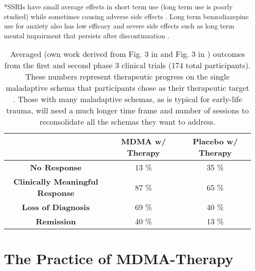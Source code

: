 \documentclass[12pt,letterpaper]{article}
\begin{document}
*SSRIs have small average effects in short term use (long term use is poorly studied) while sometimes causing adverse side effects \cite{ciprianiSSRI,bregginWithdrawal}. Long term benzodiazepine use for anxiety also has low efficacy and severe side effects such as long term mental impairment that persists after discontinuation \cite{shinfukuBenzo,barkerBenzo}. 
\FloatBarrier
\begin{table}[h!]
    \centering
    \caption{Averaged (own work derived from Fig. 3 in \textcite{mitchellMDMAClinicalTrial} and Fig. 3 in \textcite{mitchellMDMAClinicalTrial2}) outcomes from the first and second phase 3 clinical trials (174 total participants). These numbers represent therapeutic progress on the single maladaptive schema that participants chose as their therapeutic target \cite{powerTrip}. Those with many maladaptive schemas, as is typical for early-life trauma, will need a much longer time frame and number of sessions to reconsolidate all the schemas they want to address.}
    \label{table:efficacy}
    \begin{tabular}{|c|c|c|}
    \hline
     & \textbf{MDMA w/ Therapy} & \textbf{Placebo w/ Therapy} \\ \hline
    \textbf{No Response}          & 13 \%          & 35 \%          \\ \hline
    \textbf{Clinically Meaningful Response}          & 87 \%          & 65 \%         \\ \hline
    \textbf{Loss of Diagnosis} & 69 \% & 40 \% \\ \hline
    \textbf{Remission}          & 40 \%          & 13 \%          \\ \hline
    \end{tabular}
\end{table}
\FloatBarrier
{}
\section{The Practice of MDMA-Therapy}
\end{document}
